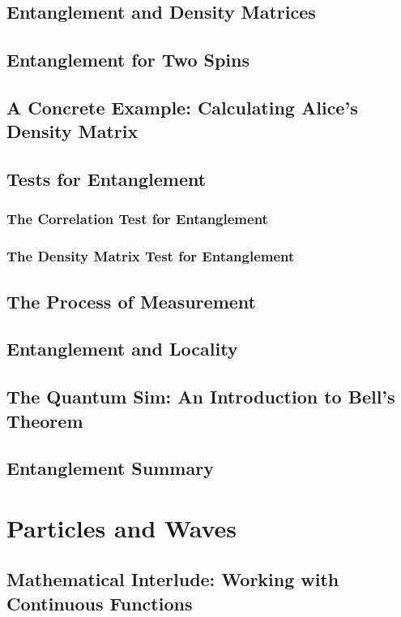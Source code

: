 \documentclass[a4paper]{article}
\begin{document}
\subsection{Entanglement and Density Matrices}
\subsection{Entanglement for Two Spins}



\subsection{A Concrete Example: Calculating Alice's Density Matrix}


\subsection{Tests for Entanglement}
\subsubsection{The Correlation Test for Entanglement}

\subsubsection{The Density Matrix Test for Entanglement}
\subsection{The Process of Measurement}

\subsection{Entanglement and Locality}
\subsection{The Quantum Sim: An Introduction to Bell's Theorem}
\subsection{Entanglement Summary}


\section{Particles and Waves}
\subsection{Mathematical Interlude: Working with Continuous Functions}
\end{document}
